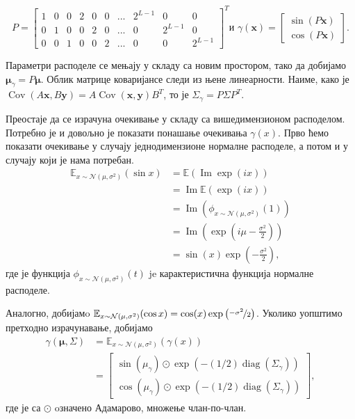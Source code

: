 \documentclass[12pt, a4paper, twoside]{book}
\numberwithin{equation}{chapter}
\numberwithin{theorem}{section}
\numberwithin{definition}{section}
\numberwithin{definitionChapter}{chapter}
\begin{document}
\begin{equation}
		P =
		\begin{bmatrix}
			1 & 0 & 0 & 2 & 0 & 0 & ... & 2^{L-1} & 0 & 0 \\
			0 & 1 & 0 & 0 & 2 & 0 & ... & 0 & 2^{L-1} & 0 \\
			0 & 0 & 1 & 0 & 0 & 2 & ... & 0 & 0 & 2^{L-1}
		\end{bmatrix}^T \text{и }
		\gamma(\mathbf{x}) =
		\begin{bmatrix}
			\sin(P\mathbf{x}) \\
			\cos(P\mathbf{x})
		\end{bmatrix}.
\end{equation}

Параметри расподеле се мењају у складу са новим простором, тако да добијамо
$\boldsymbol{\mu}_\gamma = P\boldsymbol{\mu}$. Облик матрице коваријансе следи из њене линеарности.
Наиме, како је $\operatorname{Cov}(A\mathbf{x}, B\mathbf{y}) = A\operatorname{Cov}(\mathbf{x}, \mathbf{y})B^T$,
то је $\Sigma_\gamma = P\Sigma P^T$.

Преостаје да се израчуна очекивање у складу са вишедимензионом расподелом. Потребно је и довољно је показати
понашање очекивања $\gamma(x)$. Прво ћемо показати очекивање у случају једнодимензионе нормалне расподеле, а
потом и у случају који је нама потребан.
\begin{equation}
	\begin{split}
		\mathbb{E}_{x \sim \mathcal{N}(\mu, \sigma^2)}(\sin x) & = \mathbb{E}(\operatorname{Im}\exp(ix)) \\
			& = \operatorname{Im}\mathbb{E}(\exp(ix)) \\
			& = \operatorname{Im}(\phi_{x \sim \mathcal{N}(\mu, \sigma^2)}(1)) \\
			& = \operatorname{Im}\left(\exp\left(i\mu - \frac{\sigma^2}{2}\right)\right) \\
			& = \sin(x)\exp\left(-\frac{\sigma^2}{2}\right),
	\end{split}
\end{equation}
где је функција $\phi_{x \sim \mathcal{N}(\mu, \sigma^2)}(t)$ je карактеристична функција нормалне расподеле.

Аналогно, добијамo $\mathbb{E}_{x \sim \mathcal{N}(\mu, \sigma^2)}(\cos x) = \cos(x)\exp\left(\nicefrac{-\sigma^2}{2}\right)$.
Уколико уопштимо претходно израчунавање, добијамо
\begin{equation}
	\begin{split}
		\gamma(\boldsymbol{\mu}, \Sigma) & = \mathbb{E}_{x \sim \mathcal{N}(\mu, \sigma^2)}(\gamma(x)) \\
			& =
			\begin{bmatrix}
				\sin(\mu_\gamma) \odot \exp(-(1/2)\operatorname{diag}(\Sigma_\gamma)) \\
				\cos(\mu_\gamma) \odot \exp(-(1/2)\operatorname{diag}(\Sigma_\gamma))
			\end{bmatrix},
		\label{eqn-ipe}
	\end{split}
\end{equation}
где је са $\odot$ oзначено Адамарово, множење члан-по-члан.
\end{document}
